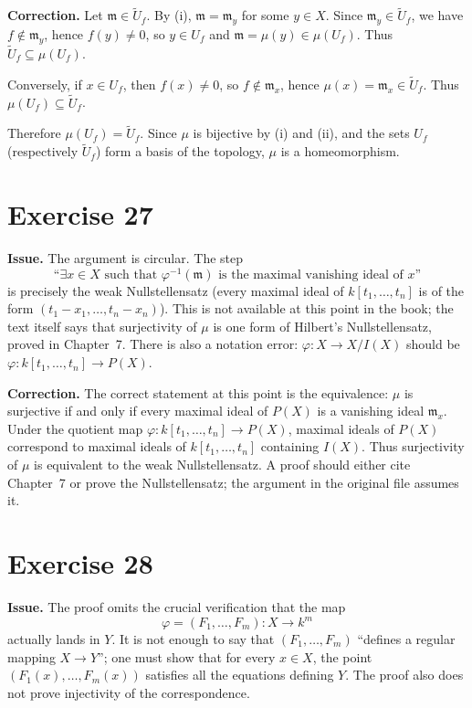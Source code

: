 \documentclass[11pt]{article}
\newcommand{\fm}{\mathfrak m}
\begin{document}
\textbf{Correction.}  Let \(\fm\in\widetilde U_f\).  By (i), \(\fm=\fm_y\) for
some \(y\in X\).  Since \(\fm_y\in\widetilde U_f\), we have
\(f\notin\fm_y\), hence \(f(y)\neq0\), so \(y\in U_f\) and
\(\fm=\mu(y)\in\mu(U_f)\).  Thus
\(\widetilde U_f\subseteq\mu(U_f)\).

Conversely, if \(x\in U_f\), then \(f(x)\neq0\), so \(f\notin\fm_x\), hence
\(\mu(x)=\fm_x\in\widetilde U_f\).  Thus
\(\mu(U_f)\subseteq\widetilde U_f\).

Therefore \(\mu(U_f)=\widetilde U_f\).  Since \(\mu\) is bijective by (i) and
(ii), and the sets \(U_f\) (respectively \(\widetilde U_f\)) form a basis of
the topology, \(\mu\) is a homeomorphism.

\section*{Exercise 27}

\textbf{Issue.}  The argument is circular.  The step
\[
\text{``}\exists x\in X\text{ such that }\varphi^{-1}(\fm)
\text{ is the maximal vanishing ideal of }x\text{''}
\]
is precisely the weak Nullstellensatz (every maximal ideal of
\(k[t_1,\ldots,t_n]\) is of the form
\((t_1-x_1,\ldots,t_n-x_n)\)).  This is not available at this point in the
book; the text itself says that surjectivity of \(\mu\) is one form of
Hilbert's Nullstellensatz, proved in Chapter~7.  There is also a notation
error: \(\varphi:X\to X/I(X)\) should be
\(\varphi:k[t_1,\ldots,t_n]\to P(X)\).

\textbf{Correction.}  The correct statement at this point is the equivalence:
\(\mu\) is surjective if and only if every maximal ideal of \(P(X)\) is a
vanishing ideal \(\fm_x\).  Under the quotient map
\(\varphi:k[t_1,\ldots,t_n]\to P(X)\), maximal ideals of \(P(X)\) correspond
to maximal ideals of \(k[t_1,\ldots,t_n]\) containing \(I(X)\).  Thus
surjectivity of \(\mu\) is equivalent to the weak Nullstellensatz.  A proof
should either cite Chapter~7 or prove the Nullstellensatz; the argument in
the original file assumes it.

\section*{Exercise 28}

\textbf{Issue.}  The proof omits the crucial verification that the map
\[
\varphi=(F_1,\ldots,F_m):X\longrightarrow k^m
\]
actually lands in \(Y\).  It is not enough to say that
\((F_1,\ldots,F_m)\) ``defines a regular mapping \(X\to Y\)''; one must show
that for every \(x\in X\), the point \((F_1(x),\ldots,F_m(x))\) satisfies all
the equations defining \(Y\).  The proof also does not prove injectivity of
the correspondence.
\end{document}
